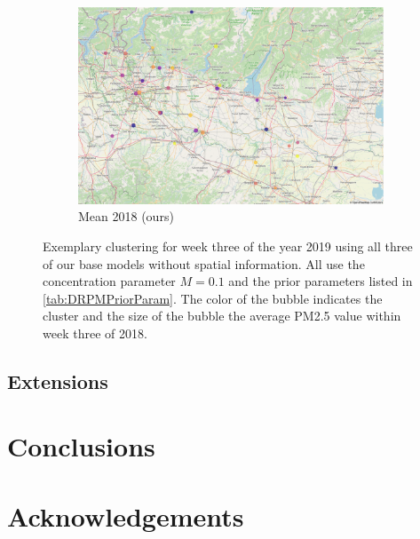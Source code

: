 \documentclass[12pt,a4paper]{article}
\begin{document}
\begin{figure}
\begin{subfigure}[b]{0.49\textwidth}
         \includegraphics[width=\textwidth]{./imgs/drpm_base_clustering_mean_prev_year.png}
         \caption{Mean 2018 (ours)}
         \label{fig:DRPMMeanPreviousYear}
     \end{subfigure}
        \caption{Exemplary clustering for week three of the year 2019 using all three of
        our base models without spatial information. All use the concentration parameter
        $M=0.1$ and the prior parameters listed in \cref{tab:DRPMPriorParam}. The color of
        the bubble indicates the cluster and the size of the bubble the average PM2.5 value
        within week three of 2018.}
        \label{fig:DRPMClusteringBaseModels}
\end{figure}

\subsection{Extensions}


\newpage

\section{Conclusions}



\vspace{0.5cm}

\newpage

\nocite{*}
\newpage
\printbibliography

\newpage

\section{Acknowledgements}
\end{document}

